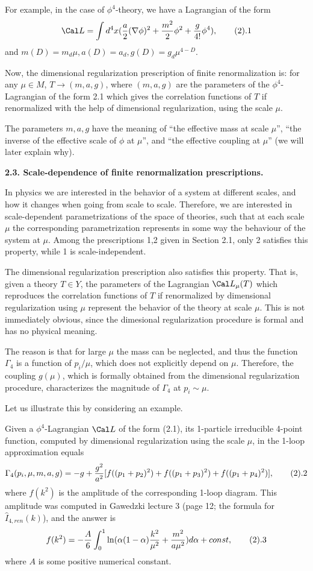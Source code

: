For example, in the case of $\phi^4$-theory, 
we have a Lagrangian of the form 
$$
\Cal L=\int d^4x(\frac{a}{2}(\nabla\phi)^2+\frac{m^2}{2}\phi^2+
\frac{g}{4!}\phi^4),\tag 2.1
$$
and $m(D)=m_d\mu, a(D)=a_d,g(D)=g_d\mu^{4-D}$. 

Now, the dimensional regularization prescription
of finite renormalization is:  
for any $\mu\in M$, $T\to (m,a,g)$, where $(m,a,g)$  
are the parameters 
of the $\phi^4$-Lagrangian of the form 2.1
which gives the correlation functions of $T$ if 
renormalized with the help of dimensional regularization, using 
the scale $\mu$. 

The parameters $m,a,g$ have the meaning of 
``the effective mass at scale $\mu$'', ``the inverse of the effective  
scale of $\phi$ at $\mu$'', and ``the effective coupling 
at $\mu$'' (we will later explain why). 

{\bf 2.3. Scale-dependence of 
finite renormalization prescriptions.}

In physics we are interested in the behavior of a system
at different scales, and how it changes when going from scale to scale. 
Therefore, we are interested in scale-dependent parametrizations
of the space of theories, such that at each scale $\mu$ 
the corresponding parametrization represents in some way the behaviour
of the system at $\mu$. 
Among the prescriptions 1,2 
given in Section 2.1, only 2 satisfies this property,
while 1 is scale-independent. 

The dimensional regularization
prescription also satisfies this property.
That is, given a theory $T\in Y$, 
the parameters of the Lagrangian $\Cal L_\mu(T)$ which 
reproduces the correlation functions of $T$ if renormalized 
by dimensional regularization using $\mu$
represent the behavior of the theory 
at scale $\mu$. This is not immediately obvious, since the dimesional 
regularization procedure is formal and has no physical meaning.

The reason is that for large $\mu$ the mass
can be neglected, and thus the function $\Gamma_4$
is a function of $p_i/\mu$,
which does not explicitly depend on $\mu$. 
Therefore, the coupling $g(\mu)$, which is formally obtained from 
the dimensional regularization procedure, characterizes the magnitude
of $\Gamma_4$ at $p_i\sim\mu$. 

Let us illustrate this
by considering an example. 

Given a $\phi^4$-Lagrangian $\Cal L$ of the form (2.1),  
its 1-particle irreducible 4-point function, computed by dimensional 
regularization using the scale $\mu$, in the 1-loop approximation
equals  
$$
\Gamma_4(p_i,\mu,m,a,g)=-g+\frac{g^2}{a^2}
[f((p_1+p_2)^2)+f((p_1+p_3)^2)+f((p_1+p_4)^2)],\tag 2.2
$$
where $f(k^2)$ is the amplitude of the corresponding 
1-loop diagram. This amplitude was computed in Gawedzki lecture 3
(page 12; the formula for $\hat I_{4,ren}(k)$), and the answer is
$$
f(k^2)=-\frac{A}{6}\int_0^1\ln(\alpha(1-\alpha)\frac{k^2}{\mu^2}+\frac{m^2}
{a\mu^2})d\alpha+const,\tag 2.3
$$
where $A$ is some positive numerical constant.


